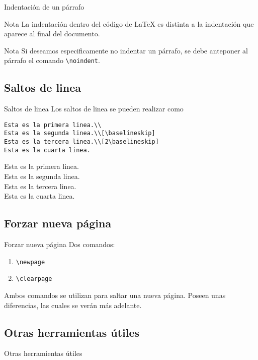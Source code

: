 \documentclass[../slides.tex]{subfiles}
\begin{document}
    \begin{frame}{Indentación de un párrafo}
        \begin{alertblock}{Nota}
        La indentación dentro del código de \LaTeX{} es distinta a la indentación que aparece al final del documento.
        \end{alertblock}
        
        \begin{block}{Nota}
        Si deseamos especificamente no indentar un párrafo, se debe anteponer al párrafo el comando \texttt{\textbackslash noindent}.
        \end{block}
    \end{frame}

    \subsection{Saltos de linea}

    \begin{frame}[fragile]{Saltos de linea}
        Los saltos de linea se pueden realizar como
            \begin{verbatim}
Esta es la primera linea.\\
Esta es la segunda linea.\\[\baselineskip]
Esta es la tercera linea.\\[2\baselineskip]
Esta es la cuarta linea.
            \end{verbatim}
Esta es la primera linea.\\
Esta es la segunda linea.\\[\baselineskip]
Esta es la tercera linea.\\[2\baselineskip]
Esta es la cuarta linea.
    \end{frame}

    \subsection{Forzar nueva página}
    \begin{frame}{Forzar nueva página}
        Dos comandos:
            \begin{enumerate}
                \item \texttt{\textbackslash newpage}
                \item \texttt{\textbackslash clearpage}
            \end{enumerate}
        Ambos comandos se utilizan para saltar una nueva página. Poseen unas diferencias, las cuales se verán más adelante.
    \end{frame}
    
    \subsection{Otras herramientas útiles}
    \begin{frame}{Otras herramientas útiles}
    \end{frame}
    
\end{document}
